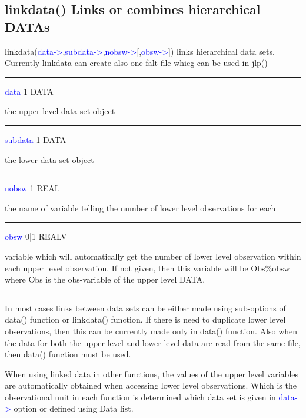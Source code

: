 \subsection{\textcolor{VioletRed}{linkdata}() Links or combines hierarchical DATAs}
\label{linkdata}
\textcolor{VioletRed}{linkdata}(\textcolor{blue}{data->},\textcolor{blue}{subdata->},\textcolor{blue}{nobsw->}[,\textcolor{blue}{obsw->}])
links hierarchical data sets. Currently linkdata can create also one falt file whicg can be used in \textcolor{VioletRed}{jlp}()
\vspace{0.3cm}
\hrule
\vspace{0.3cm}
\noindent \textcolor{blue}{data} \tabto{3cm} 1 \tabto{5cm}  DATA \tabto{7cm}
\begin{changemargin}{3cm}{0cm}
\noindent  the upper level data set object
\end{changemargin}
\vspace{0.3cm}
\hrule
\vspace{0.3cm}
\noindent \textcolor{blue}{subdata}  \tabto{3cm} 1 \tabto{5cm}  DATA \tabto{7cm}
\begin{changemargin}{3cm}{0cm}
\noindent  the lower data set object
\end{changemargin}
\vspace{0.3cm}
\hrule
\vspace{0.3cm}
\noindent \textcolor{blue}{nobsw} \tabto{3cm} 1 \tabto{5cm}  REAL  \tabto{7cm}
\begin{changemargin}{3cm}{0cm}
\noindent  the name of variable telling the number of lower level observations for each
\end{changemargin}
\vspace{0.3cm}
\hrule
\vspace{0.3cm}
\noindent \textcolor{blue}{obsw}  \tabto{3cm}  0|1  \tabto{5cm}  REALV  \tabto{7cm}
\begin{changemargin}{3cm}{0cm}
\noindent variable which will automatically get the number of lower level observation within
each upper level observation. If not given, then this variable will be
Obs\%obsw where Obs is the obs-variable of the upper level DATA.
\end {changemargin}
\hrule
\vspace{0.2cm}
\begin{note}
In most cases links between data sets can be either made using sub-options of \textcolor{VioletRed}{data}()
function or \textcolor{VioletRed}{linkdata}() function. If there is need to duplicate lower level observations, then
this can be currently made only in \textcolor{VioletRed}{data}() function. Also when the data for both the upper
level and lower level data are read from the same file, then \textcolor{VioletRed}{data}() function must be used.
\end{note}
\begin{note}
When using linked data in other functions, the values of the upper level variables are
automatically obtained when accessing lower level observations. Which is the observational
unit in each function is determined which data set is given in \textcolor{blue}{data->} option or defined using
Data list.
\end{note}

